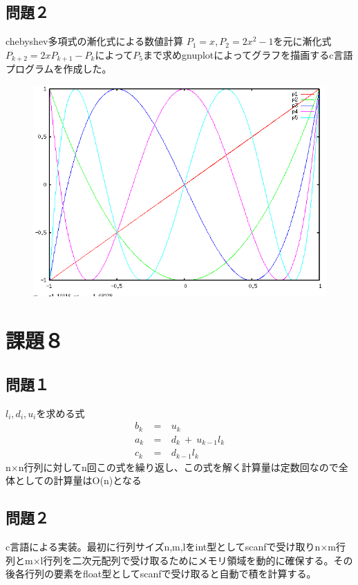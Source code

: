 \documentclass[16pt,a4paper]{jsarticle}
\begin{document}
\subsection*{問題２}
chebyshev多項式の漸化式による数値計算
$P_1 = x, P_2 = 2x^2 - 1$を元に漸化式$P_{k+2} = 2x P_{k+1} - P_k$によって$P_5$まで求めgnuplotによってグラフを描画するc言語プログラムを作成した。
\begin{figure}[h]
  \includegraphics[width=15.0cm]{chev.png}
\end{figure}

\section*{課題８}
\subsection*{問題１}
${l_i},{d_i},{u_i}$を求める式
\begin{eqnarray}
  b_k\ &=&\ u_k \nonumber \\
  a_k\ &=&\ d_k\ +\ u_{k-1}l_k \nonumber \\
  c_k\ &=&\ d_{k-1}l_k \nonumber
\end{eqnarray}
n×n行列に対してn回この式を繰り返し、この式を解く計算量は定数回なので全体としての計算量はO(n)となる
\subsection*{問題２}
c言語による実装。最初に行列サイズn,m,lをint型としてscanfで受け取りn×m行列とm×l行列を二次元配列で受け取るためにメモリ領域を動的に確保する。その後各行列の要素をfloat型としてscanfで受け取ると自動で積を計算する。


\end{document}
